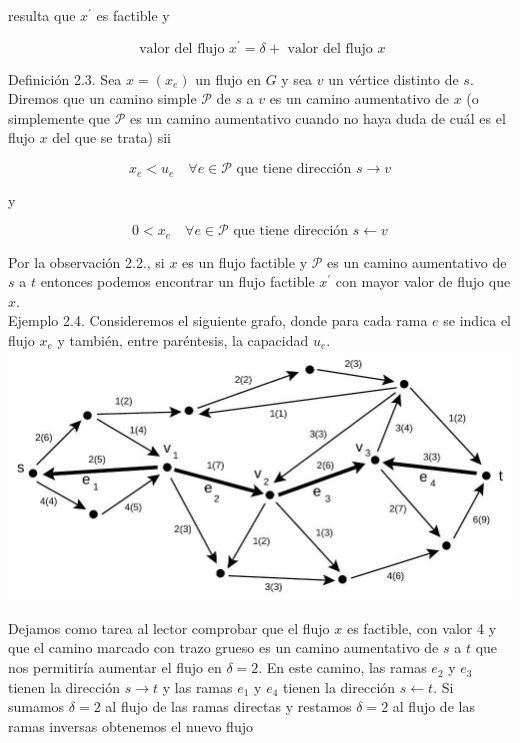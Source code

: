 \documentclass[10pt]{article}
\begin{document}
resulta que $x^{\prime}$ es factible y

$$
\text { valor del flujo } x^{\prime}=\delta+\text { valor del flujo } x
$$

Definición 2.3. Sea $x=\left(x_{e}\right)$ un flujo en $G$ y sea $v$ un vértice distinto de $s$. Diremos que un camino simple $\mathcal{P}$ de $s$ a $v$ es un camino aumentativo de $x$ (o simplemente que $\mathcal{P}$ es un camino aumentativo cuando no haya duda de cuál es el flujo $x$ del que se trata) sii

$$
x_{e}<u_{e} \quad \forall e \in \mathcal{P} \text { que tiene dirección } s \longrightarrow v
$$

y

$$
0<x_{e} \quad \forall e \in \mathcal{P} \text { que tiene dirección } s \longleftarrow v
$$

Por la observación 2.2., si $x$ es un flujo factible y $\mathcal{P}$ es un camino aumentativo de $s$ a $t$ entonces podemos encontrar un flujo factible $x^{\prime}$ con mayor valor de flujo que $x$.\\
Ejemplo 2.4. Consideremos el siguiente grafo, donde para cada rama $e$ se indica el flujo $x_{e}$ y también, entre paréntesis, la capacidad $u_{e}$.\\
\includegraphics[max width=\textwidth, center]{2025_09_05_aa5f7b8425e7dd302062g-04(1)}

Dejamos como tarea al lector comprobar que el flujo $x$ es factible, con valor 4 y que el camino marcado con trazo grueso es un camino aumentativo de $s$ a $t$ que nos permitiría aumentar el flujo en $\delta=2$. En este camino, las ramas $e_{2}$ y $e_{3}$ tienen la dirección $s \longrightarrow t$ y las ramas $e_{1}$ y $e_{4}$ tienen la dirección $s \longleftarrow t$. Si sumamos $\delta=2$ al flujo de las ramas directas y restamos $\delta=2$ al flujo de las ramas inversas obtenemos el nuevo flujo
\end{document}
